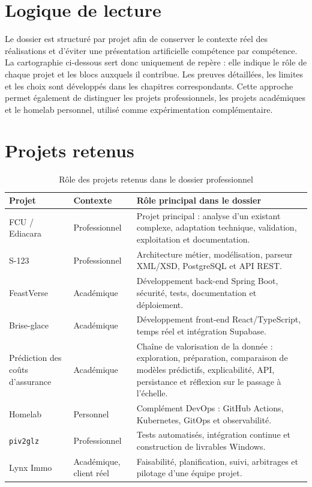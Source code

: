 \section{Logique de lecture}

Le dossier est structuré par projet afin de conserver le contexte réel des réalisations et d'éviter une présentation artificielle compétence par compétence. La cartographie ci-dessous sert donc uniquement de repère : elle indique le rôle de chaque projet et les blocs auxquels il contribue. Les preuves détaillées, les limites et les choix sont développés dans les chapitres correspondants. Cette approche permet également de distinguer les projets professionnels, les projets académiques et le homelab personnel, utilisé comme expérimentation complémentaire. \cite{referentiel-eadl}

\section{Projets retenus}

\begin{table}[H]
\centering
\small
\begin{tabular}{p{3.2cm} p{2.3cm} p{8.2cm}}
\toprule
\textbf{Projet} & \textbf{Contexte} & \textbf{Rôle principal dans le dossier} \\
\midrule
FCU / Ediacara & Professionnel & Projet principal : analyse d'un existant complexe, adaptation technique, validation, exploitation et documentation. \\
S-123 & Professionnel & Architecture métier, modélisation, parseur XML/XSD, PostgreSQL et API REST. \\
FeastVerse & Académique & Développement back-end Spring Boot, sécurité, tests, documentation et déploiement. \\
Brise-glace & Académique & Développement front-end React/TypeScript, temps réel et intégration Supabase. \\
Prédiction des coûts d'assurance & Académique & Chaîne de valorisation de la donnée : exploration, préparation, comparaison de modèles prédictifs, explicabilité, API, persistance et réflexion sur le passage à l'échelle. \\
Homelab & Personnel & Complément DevOps : GitHub Actions, Kubernetes, GitOps et observabilité. \\
\texttt{piv2glz} & Professionnel & Tests automatisés, intégration continue et construction de livrables Windows. \\
Lynx Immo & Académique, client réel & Faisabilité, planification, suivi, arbitrages et pilotage d'une équipe projet. \\
\bottomrule
\end{tabular}
\caption{Rôle des projets retenus dans le dossier professionnel}
\label{tab:cartographie-portefeuille}
\end{table}

